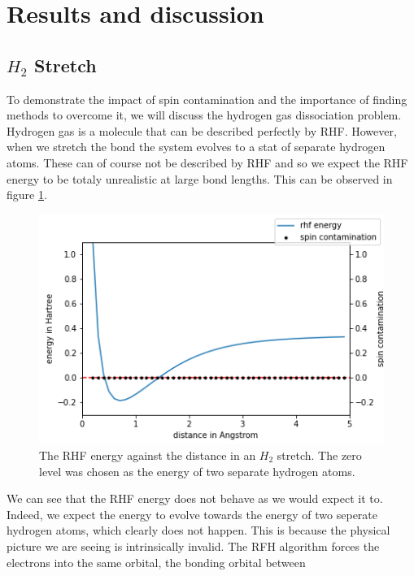 \documentclass[twoside,twocolumn,9pt]{article}
\begin{document}
\section{Results and discussion}
\label{sec:results}

\subsection{$H_2$ Stretch}
\label{subsec:h2}
To demonstrate the impact of spin contamination and the importance of finding methods to overcome it, we will discuss the hydrogen gas dissociation problem\cite{Szabo1996}. Hydrogen
gas is a molecule that can be described perfectly by RHF. However, when we stretch the bond the system evolves to a stat of separate hydrogen atoms. These can of course not be
described by RHF and so we expect the RHF energy to be totaly unrealistic at large bond lengths. This can be observed in figure \ref{fig:rhfstretch}.
\begin{center}
  \begin{figure}[h]
    \includegraphics[width=\linewidth]{./../notes/figures/rhf.png}
    \caption{The RHF energy against the distance in an $H_2$ stretch. The zero level was chosen as the energy of two separate hydrogen atoms.}
    \label{fig:rhfstretch}
  \end{figure}
\end{center}
We can see that the RHF energy does not behave as we would expect it to. Indeed, we expect the energy to evolve towards the energy of two seperate hydrogen atoms, which clearly does
not happen. This is because the physical picture we are seeing is intrinsically invalid. The RFH algorithm forces the electrons into the same orbital, the bonding orbital between
\end{document}
